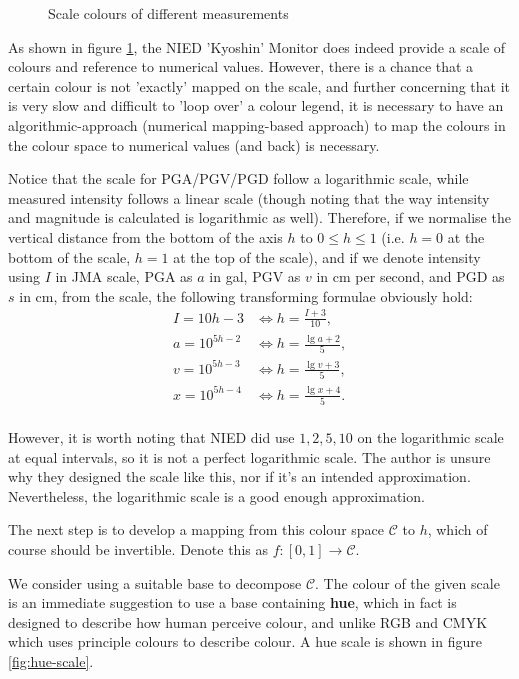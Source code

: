 \documentclass[10pt]{article}
\begin{document}
\begin{figure}[!ht]
    \caption{Scale colours of different measurements}
    \label{fig:scale-colour}
\end{figure}

As shown in figure \ref{fig:scale-colour}, the NIED 'Kyoshin' Monitor does indeed provide a scale of colours and reference to numerical values. However, there is a chance that a certain colour is not 'exactly' mapped on the scale, and further concerning that it is very slow and difficult to 'loop over' a colour legend, it is necessary to have an algorithmic-approach (numerical mapping-based approach) to map the colours in the colour space to numerical values (and back) is necessary.

Notice that the scale for PGA/PGV/PGD follow a logarithmic scale, while measured intensity follows a linear scale (though noting that the way intensity and magnitude is calculated is logarithmic as well). Therefore, if we normalise the vertical distance from the bottom of the axis \(h\) to \(0 \leq h \leq 1\) (i.e. \(h = 0\) at the bottom of the scale, \(h = 1\) at the top of the scale), and if we denote intensity using \(I\) in JMA scale, PGA as \(a\) in gal, PGV as \(v\) in cm per second, and PGD as \(s\) in cm, from the scale, the following transforming formulae obviously hold:
\begin{align*}
    I  = 10h - 3     & \iff h      = \frac{I + 3}{10}, \\
    a  = 10^{5h - 2} & \iff h  = \frac{\lg a + 2}{5},  \\
    v  = 10^{5h - 3} & \iff h  = \frac{\lg v + 3}{5},  \\
    x  = 10^{5h - 4} & \iff h  = \frac{\lg x + 4}{5}.  \\
\end{align*}

However, it is worth noting that NIED did use \(1, 2, 5, 10\) on the logarithmic scale at equal intervals, so it is not a perfect logarithmic scale. The author is unsure why they designed the scale like this, nor if it's an intended approximation. Nevertheless, the logarithmic scale is a good enough approximation.

The next step is to develop a mapping from this colour space \(\mathcal{C}\) to \(h\), which of course should be invertible. Denote this as \(f: [0, 1] \to \mathcal{C}\).

We consider using a suitable base to decompose \(\mathcal{C}\). The colour of the given scale is an immediate suggestion to use a base containing \textbf{hue}, which in fact is designed to describe how human perceive colour, and unlike RGB and CMYK which uses principle colours to describe colour. A hue scale is shown in figure \ref{fig:hue-scale}.
\end{document}
